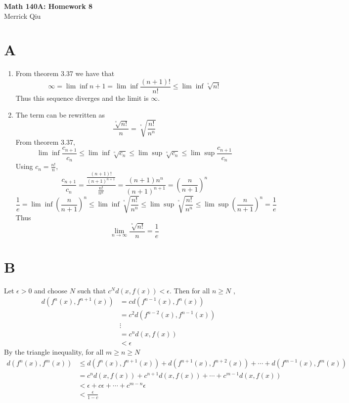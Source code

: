 \documentclass{article}
\begin{document}
\begin{center}
	\huge{\bf Math 140A: Homework 8} \\
	Merrick Qiu
\end{center}

\section*{A}
\begin{enumerate}
	\item From theorem 3.37 we have that 
	\[	
		\infty = \lim \inf n+1 = \lim \inf \frac{(n+1)!}{n!} \leq \lim \inf \sqrt[^n]{n!}
	\]
	Thus this sequence diverges and the limit is $\infty$.
	\item
	The term can be rewritten as
	\[
		\frac{\sqrt[^n]{n!}}{n} = \sqrt[^n]{\frac{n!}{n^n}}
	\]
	From theorem 3.37,
	\[
		\lim \inf \frac{c_{n+1}}{c_n} \leq \lim \inf \sqrt[^n]{c_n} \leq \lim \sup \sqrt[^n]{c_n} \leq \lim \sup \frac{c_{n+1}}{c_n}
	\]
	Using $c_n = \frac{n!}{n}$,
	\[
		\frac{c_{n+1}}{c_n} = \frac{\frac{(n+1)!}{(n+1)^{n+1}}}{\frac{n!}{n^n}} = \frac{(n+1)n^n}{(n+1)^{n+1}}=\left(\frac{n}{n+1}\right)^n
	\]
	\[
		 \frac{1}{e} = \lim \inf \left(\frac{n}{n+1}\right)^n \leq \lim \inf \sqrt[^n]{\frac{n!}{n^n}} \leq \lim \sup \sqrt[^n]{\frac{n!}{n^n}} \leq \lim \sup \left(\frac{n}{n+1}\right)^n = \frac{1}{e}
	\]
	Thus 
	\[
		\lim_{n \to \infty} \frac{\sqrt[^n]{n!}}{n} = \frac{1}{e}
	\]
\end{enumerate}
\newpage 

\section*{B}
Let $\epsilon > 0$ and choose $N$ such that $c^Nd(x, f(x)) < \epsilon$.
Then for all $n\geq N$ ,
\begin{align*}
	d(f^n(x), f^{n+1}(x)) &= cd(f^{n-1}(x), f^{n}(x))\\
	&= c^2d(f^{n-2}(x), f^{n-1}(x))\\
	&\vdots \\
	&= c^n d(x, f(x)) \\
	&< \epsilon
\end{align*}
By the triangle inequality, for all $m \geq n \geq N$ 
\begin{align*}
	d(f^n(x), f^{m}(x)) &\leq d(f^{n}(x), f^{n+1}(x)) + d(f^{n+1}(x), f^{n+2}(x)) + \cdots + d(f^{m-1}(x), f^{m}(x))\\
	&= c^n d(x, f(x)) + c^{n+1}d(x, f(x)) + \cdots + c^{m-1}d(x, f(x))\\
	&< \epsilon + c\epsilon + \cdots +c^{m-n}\epsilon \\
	&< \frac{\epsilon}{1-c} \\
\end{align*}
\end{document}
